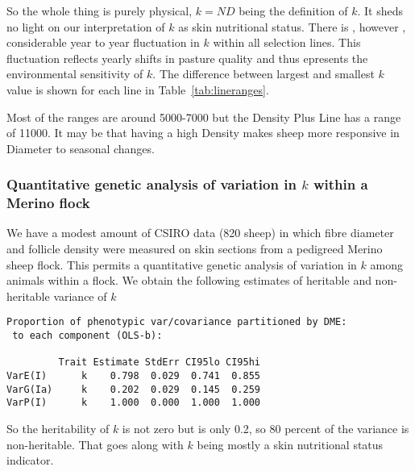 \documentclass[titlepage]{article}  %
\begin{document}
So the whole thing is purely physical, $k = ND$ being the definition of $k$. It sheds no light on our interpretation of $k$ as skin nutritional status. There is , however , considerable year to year fluctuation in $k$ within all selection lines.  This fluctuation reflects yearly shifts in pasture quality and thus epresents the environmental sensitivity of $k$.   The difference between largest and smallest $k$ value is shown for each line in Table~\ref{tab:lineranges}.

Most of the ranges are around 5000-7000 but the Density Plus Line has a range of 11000. It may be that having a high Density makes sheep more responsive in Diameter to seasonal changes. 

\subsubsection{Quantitative genetic analysis of variation in $k$ within a Merino flock}
We have a modest amount of CSIRO data (820 sheep) in which fibre diameter and follicle density were measured on skin sections from a pedigreed Merino sheep flock.  This permits a quantitative genetic analysis of variation in $k$ among animals within a flock. We obtain the following estimates of heritable and non-heritable variance of $k$
\begin{verbatim}
Proportion of phenotypic var/covariance partitioned by DME:
 to each component (OLS-b):

         Trait Estimate StdErr CI95lo CI95hi
VarE(I)      k    0.798  0.029  0.741  0.855
VarG(Ia)     k    0.202  0.029  0.145  0.259
VarP(I)      k    1.000  0.000  1.000  1.000
\end{verbatim}
So the heritability of $k$ is not zero but is only 0.2, so 80 percent of the variance is non-heritable. That goes along with $k$ being mostly a skin nutritional status indicator.
\end{document}
